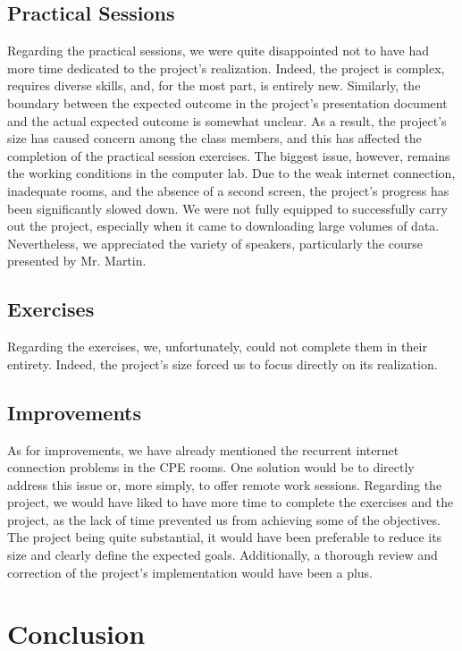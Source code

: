 \documentclass{article}
\begin{document}
    \subsection{Practical Sessions}\label{subsec:sessions}
    Regarding the practical sessions, we were quite disappointed not to have had more time dedicated to the project's realization.
    Indeed, the project is complex, requires diverse skills, and, for the most part, is entirely new.
    Similarly, the boundary between the expected outcome in the project's presentation document and the actual expected outcome is somewhat unclear.
    As a result, the project's size has caused concern among the class members, and this has affected the completion of the practical session exercises.
    The biggest issue, however, remains the working conditions in the computer lab.
    Due to the weak internet connection, inadequate rooms, and the absence of a second screen, the project's progress has been significantly slowed down.
    We were not fully equipped to successfully carry out the project, especially when it came to downloading large volumes of data.
    Nevertheless, we appreciated the variety of speakers, particularly the course presented by Mr. Martin.

    \subsection{Exercises}\label{subsec:exercises}
    Regarding the exercises, we, unfortunately, could not complete them in their entirety.
    Indeed, the project's size forced us to focus directly on its realization.

    \subsection{Improvements}\label{subsec:improvements}
    As for improvements, we have already mentioned the recurrent internet connection problems in the CPE rooms.
    One solution would be to directly address this issue or, more simply, to offer remote work sessions.
    Regarding the project, we would have liked to have more time to complete the exercises and the project, as the lack of time prevented us from achieving some of the objectives.
    The project being quite substantial, it would have been preferable to reduce its size and clearly define the expected goals.
    Additionally, a thorough review and correction of the project's implementation would have been a plus.


    \section{Conclusion}\label{sec:conclusion}
\end{document}

